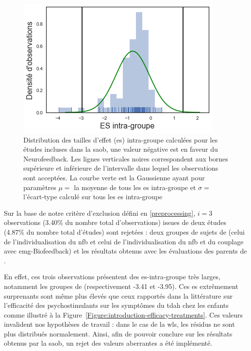 \begin{figure}[h!]
  \centering
	\includegraphics[width=0.7\linewidth]{figures/chapter-3/distribution-ES-within} 
  \caption[Distribution des tailles d'effet intra-groupe calculées pour les études incluses dans la \gls{saob}.]{Distribution des tailles d'effet (\gls{es}) intra-groupe calculées pour les études 
	incluses dans la \gls{saob}, une valeur négative est en faveur du Neurofeedback. Les lignes 
	verticales noires correspondent aux bornes supérieure et 
	inférieure de l'intervalle dans lequel les observations sont acceptées. La courbe verte est la Gaussienne ayant pour paramètres $\mu =$ la moyenne
	de tous les \gls{es} intra-groupe et $\sigma =$ l'écart-type calculé sur tous les \gls{es} intra-groupe}
  \label{Figure:distribution_ES_within}
\end{figure}

Sur la base de notre critère d'exclusion défini en \ref{preprocessing}, $i = 3$ observations (3.40\% du nombre total d'observations) issues de deux études (4.87\% du nombre total d'études) 
sont rejetées : deux groupes de sujets de \citet{Bazanova2018} (celui de l'individualisation du \gls{nfb} et 
celui de l'individualisation du \gls{nfb} et du couplage avec \gls{emg}-Biofeedback) et les résultats obtenus avec les évaluations des 
parents de \citet{Rajabi2019}. 

En effet, ces trois observations présentent des \gls{es}-intra-groupe très larges, notamment les groupes de \citet{Bazanova2018} 
(respectivement -3.41 et -3.95). Ces \gls{es} extrêmement surprenants sont même plus élevés que ceux rapportés dans la littérature sur l'efficacité 
des psychostimulants sur les symptômes du \gls{tdah} chez les enfants \citep{Luan2017} comme illustré à la Figure~\ref{Figure:introduction-efficacy-treatments}. 
Ces valeurs invalident nos hypothèses de travail : dans le cas de la 
\gls{wls}, les résidus ne sont plus distribués normalement. Ainsi, afin de pouvoir conclure sur les résultats obtenus par la \gls{saob}, 
un rejet des valeurs aberrantes a été implémenté.

